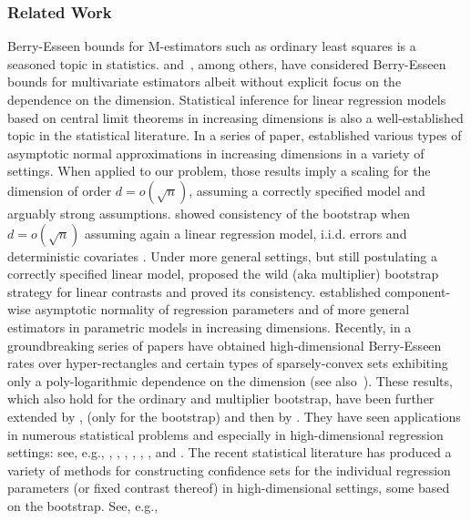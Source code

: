 \documentclass{article}
\begin{document}
\subsubsection*{Related Work}
Berry-Esseen bounds for M-estimators such as ordinary least squares is a seasoned topic in statistics. \cite{pfanzagl1973accuracy} and~\cite{paulauskas1996rates}, among others, have considered Berry-Esseen bounds for multivariate estimators albeit without explicit focus on the dependence on the dimension.
Statistical inference for linear regression models based on central limit theorems in increasing dimensions is also a well-established topic in the statistical literature.
In a series of paper, \cite{Portnoy84,Portnoy85,Portnoy86,Portnoy88} established
various types of asymptotic normal approximations in increasing dimensions in a variety of settings. When applied to our problem, those results imply a scaling for the dimension of order $d = o(\sqrt{n})$, assuming a correctly specified model and arguably strong assumptions.
\cite{bickel1983bootstrapping}
showed
consistency of the bootstrap
when $d=o(\sqrt{n})$ assuming again a linear regression model, i.i.d. errors and deterministic covariates \cite{mammen1989}. Under more general settings, but still postulating a correctly specified linear model, \cite{mammen1993} proposed the wild (aka multiplier) bootstrap strategy \citep{liu1988} for linear contrasts and proved its consistency. \cite{He2000} \citep{welsh1989} established component-wise asymptotic normality of regression parameters and of more general estimators in parametric models in increasing dimensions.
Recently, in a groundbreaking series of papers \cite{Cher13,chernozhukov2017detailed, chernozhukov2019improved} have obtained high-dimensional Berry-Esseen rates over hyper-rectangles and certain types of sparsely-convex sets exhibiting only a poly-logarithmic dependence on the dimension (see also~\citet{MR1115160}). These results, which also hold for the ordinary and multiplier bootstrap,
have been further extended by
\cite{2018arXiv180606153K}, \cite{hang.hzhang.bootstrap.17} (only for the bootstrap)
and then by \cite{koike2019high}. They have seen applications in numerous statistical problems and especially in high-dimensional regression settings: see, e.g., \cite{zhang2014confidence}, \cite{wasserman2014berry}, \cite{10.1093/biomet/asu056},
\cite{doi:10.1146/annurev-economics-012315-015826}, \cite{zhang2017simultaneous}, \cite{test}, \cite{boot}
and \cite{hang.hzhang.bootstrap.17}.
The recent statistical literature has produced a variety of methods for constructing confidence sets for the individual regression parameters (or fixed contrast thereof) in high-dimensional settings, some based on the bootstrap. See, e.g.,
\end{document}
